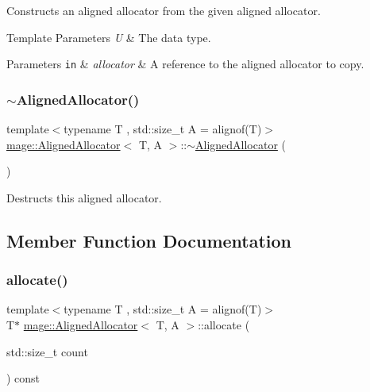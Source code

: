 Constructs an aligned allocator from the given aligned allocator.


\begin{DoxyTemplParams}{Template Parameters}
{\em U} & The data type. \\
\hline
\end{DoxyTemplParams}

\begin{DoxyParams}[1]{Parameters}
\mbox{\tt in}  & {\em allocator} & A reference to the aligned allocator to copy. \\
\hline
\end{DoxyParams}
\mbox{\label{classmage_1_1_aligned_allocator_aafac29097c8439629bc814d1f5bd0d24}} 
\subsubsection{\texorpdfstring{$\sim$\+Aligned\+Allocator()}{~AlignedAllocator()}}
{\footnotesize\ttfamily template$<$typename T , std\+::size\+\_\+t A = alignof(\+T)$>$ \\
\mbox{\hyperlink{classmage_1_1_aligned_allocator}{mage\+::\+Aligned\+Allocator}}$<$ T, A $>$\+::$\sim$\mbox{\hyperlink{classmage_1_1_aligned_allocator}{Aligned\+Allocator}} (\begin{DoxyParamCaption}{ }\end{DoxyParamCaption})\hspace{0.3cm}{\ttfamily [default]}}

Destructs this aligned allocator. 

\subsection{Member Function Documentation}
\mbox{\label{classmage_1_1_aligned_allocator_ac93afe4edd9d5d759374a56138087835}} 
\subsubsection{\texorpdfstring{allocate()}{allocate()}\hspace{0.1cm}{\footnotesize\ttfamily [1/2]}}
{\footnotesize\ttfamily template$<$typename T , std\+::size\+\_\+t A = alignof(\+T)$>$ \\
T$\ast$ \mbox{\hyperlink{classmage_1_1_aligned_allocator}{mage\+::\+Aligned\+Allocator}}$<$ T, A $>$\+::allocate (\begin{DoxyParamCaption}\item[{std\+::size\+\_\+t}]{count }\end{DoxyParamCaption}) const}

